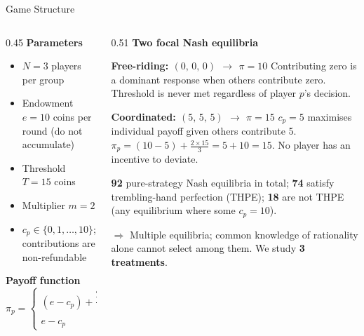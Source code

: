 \documentclass[aspectratio=169,10pt]{beamer}
\newcommand{\cg}[1]{\textcolor{controlgreen}{\textbf{#1}}}
\newcommand{\cb}[1]{\textcolor{chatblue}{\textbf{#1}}}
\begin{document}
\begin{frame}{Game Structure}

\begin{columns}[T]
  \begin{column}{0.45\textwidth}
    \textbf{Parameters}
    \begin{itemize}\small
      \item $N = 3$ players per group
      \item Endowment $e = 10$ coins per round (do not accumulate)
      \item Threshold $T = 15$ coins
      \item Multiplier $m = 2$
      \item $c_p \in \{0, 1, \ldots, 10\}$; contributions are non-refundable
    \end{itemize}

    \vspace{0.5em}
    \textbf{Payoff function}
    \[
      \pi_p =
      \begin{cases}
        (e - c_p) + \dfrac{2\displaystyle\sum c_j}{3}
          & \text{if } \textstyle\sum c_j \geq 15 \\[8pt]
        e - c_p
          & \text{if } \textstyle\sum c_j < 15
      \end{cases}
    \]
  \end{column}

  \begin{column}{0.51\textwidth}
    \textbf{Two focal Nash equilibria}

    \vspace{0.2em}
    \begin{block}{\cg{Free-riding: $(0,\,0,\,0)$ $\to$ $\pi = 10$}}
      \small Contributing zero is a dominant response when others contribute zero.
      Threshold is never met regardless of player $p$'s decision.
    \end{block}

    \vspace{0.2em}
    \begin{block}{\cb{Coordinated: $(5,\,5,\,5)$ $\to$ $\pi = 15$}}
      \small $c_p = 5$ maximises individual payoff given others contribute 5.\\
      $\pi_p = (10{-}5) + \tfrac{2 \times 15}{3} = 5 + 10 = 15$.
      No player has an incentive to deviate.
    \end{block}

    \vspace{0.3em}
    \small
    \textbf{92} pure-strategy Nash equilibria in total;
    \textbf{74} satisfy trembling-hand perfection (THPE);
    \textbf{18} are not THPE (any equilibrium where some $c_p = 10$).

    \vspace{0.4em}
    $\Rightarrow$ Multiple equilibria; common knowledge of rationality alone cannot select among them.
    We study \textbf{3 treatments}.
  \end{column}
\end{columns}

\end{frame}
\end{document}

